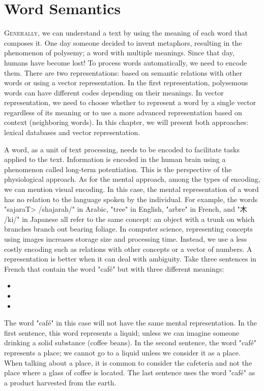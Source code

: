 \documentclass{KBook}
\begin{document}
		\mainmatter
	
\fi

\chapter{Word Semantics}

\begin{introduction}
	\lettrine{G}{enerally}, we can understand a text by using the meaning of each word that composes it. One day someone decided to invent metaphors, resulting in the phenomenon of polysemy; a word with multiple meanings. Since that day, humans have become lost! To process words automatically, we need to encode them. There are two representations: based on semantic relations with other words or using a vector representation. In the first representation, polysemous words can have different codes depending on their meanings. In vector representation, we need to choose whether to represent a word by a single vector regardless of its meaning or to use a more advanced representation based on context (neighboring words). In this chapter, we will present both approaches: lexical databases and vector representation.
\end{introduction}

A word, as a unit of text processing, needs to be encoded to facilitate tasks applied to the text. Information is encoded in the human brain using a phenomenon called long-term potentiation. This is the perspective of the physiological approach. As for the mental approach, among the types of encoding, we can mention visual encoding. In this case, the mental representation of a word has no relation to the language spoken by the individual. For example, the words "\<sajaraT> /shajarah/" in Arabic, "tree" in English, "arbre" in French, and "木 /ki/" in Japanese all refer to the same concept: an object with a trunk on which branches branch out bearing foliage. In computer science, representing concepts using images increases storage size and processing time. Instead, we use a less costly encoding such as relations with other concepts or a vector of numbers. A representation is better when it can deal with ambiguity. Take three sentences in French that contain the word "café" but with three different meanings:
\begin{itemize}
	\item {}
	\item {}
	\item {}
\end{itemize}
The word "café" in this case will not have the same mental representation. In the first sentence, this word represents a liquid; unless we can imagine someone drinking a solid substance (coffee beans). In the second sentence, the word "café" represents a place; we cannot go to a liquid unless we consider it as a place. When talking about a place, it is common to consider the cafeteria and not the place where a glass of coffee is located. The last sentence uses the word "café" as a product harvested from the earth.
\end{document}
